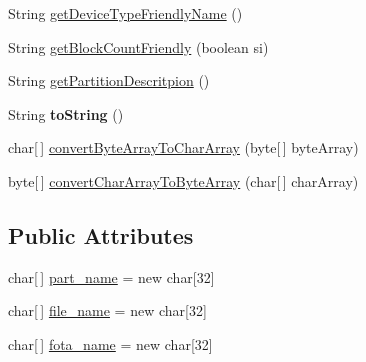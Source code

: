 \begin{DoxyCompactItemize}
\item 
String \hyperlink{class_c_a_s_u_a_l_1_1archiving_1_1libpit_1_1_pit_entry_abaac8bab08ad261006d7638510ac45fa}{get\-Device\-Type\-Friendly\-Name} ()
\item 
String \hyperlink{class_c_a_s_u_a_l_1_1archiving_1_1libpit_1_1_pit_entry_a67803574102dff7d60a87cb785eb327d}{get\-Block\-Count\-Friendly} (boolean si)
\item 
String \hyperlink{class_c_a_s_u_a_l_1_1archiving_1_1libpit_1_1_pit_entry_a0c1f5626ed15b63632a25b7107790442}{get\-Partition\-Descritpion} ()
\item 
\hypertarget{class_c_a_s_u_a_l_1_1archiving_1_1libpit_1_1_pit_entry_afc3393197ca61b33f848473150b26221}{String {\bfseries to\-String} ()}\label{class_c_a_s_u_a_l_1_1archiving_1_1libpit_1_1_pit_entry_afc3393197ca61b33f848473150b26221}

\item 
char\mbox{[}$\,$\mbox{]} \hyperlink{class_c_a_s_u_a_l_1_1archiving_1_1libpit_1_1_pit_entry_a1bd37b3058a9be2b40c288d23aefbf73}{convert\-Byte\-Array\-To\-Char\-Array} (byte\mbox{[}$\,$\mbox{]} byte\-Array)
\item 
byte\mbox{[}$\,$\mbox{]} \hyperlink{class_c_a_s_u_a_l_1_1archiving_1_1libpit_1_1_pit_entry_a905bd7899229d0c728e5a41d17eccd6e}{convert\-Char\-Array\-To\-Byte\-Array} (char\mbox{[}$\,$\mbox{]} char\-Array)
\end{DoxyCompactItemize}
\subsection*{Public Attributes}
\begin{DoxyCompactItemize}
\item 
char\mbox{[}$\,$\mbox{]} \hyperlink{class_c_a_s_u_a_l_1_1archiving_1_1libpit_1_1_pit_entry_a8b20459af269e6d4b662e4ffa7be7797}{part\-\_\-name} = new char\mbox{[}32\mbox{]}
\item 
char\mbox{[}$\,$\mbox{]} \hyperlink{class_c_a_s_u_a_l_1_1archiving_1_1libpit_1_1_pit_entry_a7388f05175e0ce987837143a20c001b8}{file\-\_\-name} = new char\mbox{[}32\mbox{]}
\item 
char\mbox{[}$\,$\mbox{]} \hyperlink{class_c_a_s_u_a_l_1_1archiving_1_1libpit_1_1_pit_entry_aba9afd6f46bd79aa19fb5f164751765f}{fota\-\_\-name} = new char\mbox{[}32\mbox{]}
\end{DoxyCompactItemize}
